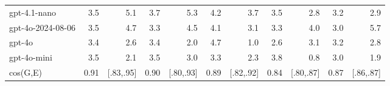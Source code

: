 \documentclass{article}
\begin{document}
\begin{table}[H]
\begin{center}
{\begin{tabular}{@{}lrrrrrrrrrr@{}}
gpt-4.1-nano &\cellcolor[HTML]{8DD3BA}\textcolor[HTML]{1A1A1A}{3.5}&\cellcolor[HTML]{3EB3C4}\textcolor[HTML]{1A1A1A}{5.1}&\cellcolor[HTML]{82CEBB}\textcolor[HTML]{1A1A1A}{3.7}&\cellcolor[HTML]{38ADC3}\textcolor[HTML]{1A1A1A}{5.3}&\cellcolor[HTML]{69C5BE}\textcolor[HTML]{1A1A1A}{4.2}&\cellcolor[HTML]{82CEBB}\textcolor[HTML]{1A1A1A}{3.7}&\cellcolor[HTML]{8DD3BA}\textcolor[HTML]{1A1A1A}{3.5}&\cellcolor[HTML]{B6E2B6}\textcolor[HTML]{1A1A1A}{2.8}&\cellcolor[HTML]{9FD9B8}\textcolor[HTML]{1A1A1A}{3.2}&\cellcolor[HTML]{B0E0B6}\textcolor[HTML]{1A1A1A}{2.9} \\
gpt-4o-2024-08-06 &\cellcolor[HTML]{8DD3BA}\textcolor[HTML]{1A1A1A}{3.5}&\cellcolor[HTML]{50BCC2}\textcolor[HTML]{1A1A1A}{4.7}&\cellcolor[HTML]{99D7B8}\textcolor[HTML]{1A1A1A}{3.3}&\cellcolor[HTML]{5ABFC0}\textcolor[HTML]{1A1A1A}{4.5}&\cellcolor[HTML]{6EC7BE}\textcolor[HTML]{1A1A1A}{4.1}&\cellcolor[HTML]{A4DCB7}\textcolor[HTML]{1A1A1A}{3.1}&\cellcolor[HTML]{99D7B8}\textcolor[HTML]{1A1A1A}{3.3}&\cellcolor[HTML]{73C8BD}\textcolor[HTML]{1A1A1A}{4.0}&\cellcolor[HTML]{AADEB7}\textcolor[HTML]{1A1A1A}{3.0}&\cellcolor[HTML]{2DA1C2}\textcolor[HTML]{EEF3F8}{5.7} \\
gpt-4o &\cellcolor[HTML]{93D5B9}\textcolor[HTML]{1A1A1A}{3.4}&\cellcolor[HTML]{C1E7B5}\textcolor[HTML]{1A1A1A}{2.6}&\cellcolor[HTML]{93D5B9}\textcolor[HTML]{1A1A1A}{3.4}&\cellcolor[HTML]{D6EFB3}\textcolor[HTML]{1A1A1A}{2.0}&\cellcolor[HTML]{50BCC2}\textcolor[HTML]{1A1A1A}{4.7}&\cellcolor[HTML]{F1F9B9}\textcolor[HTML]{1A1A1A}{1.0}&\cellcolor[HTML]{C1E7B5}\textcolor[HTML]{1A1A1A}{2.6}&\cellcolor[HTML]{A4DCB7}\textcolor[HTML]{1A1A1A}{3.1}&\cellcolor[HTML]{9FD9B8}\textcolor[HTML]{1A1A1A}{3.2}&\cellcolor[HTML]{B6E2B6}\textcolor[HTML]{1A1A1A}{2.8} \\
gpt-4o-mini &\cellcolor[HTML]{8DD3BA}\textcolor[HTML]{1A1A1A}{3.5}&\cellcolor[HTML]{D3EEB3}\textcolor[HTML]{1A1A1A}{2.1}&\cellcolor[HTML]{8DD3BA}\textcolor[HTML]{1A1A1A}{3.5}&\cellcolor[HTML]{AADEB7}\textcolor[HTML]{1A1A1A}{3.0}&\cellcolor[HTML]{99D7B8}\textcolor[HTML]{1A1A1A}{3.3}&\cellcolor[HTML]{CDEBB4}\textcolor[HTML]{1A1A1A}{2.3}&\cellcolor[HTML]{7DCCBB}\textcolor[HTML]{1A1A1A}{3.8}&\cellcolor[HTML]{F3FBBF}\textcolor[HTML]{1A1A1A}{0.8}&\cellcolor[HTML]{AADEB7}\textcolor[HTML]{1A1A1A}{3.0}&\cellcolor[HTML]{D9F0B3}\textcolor[HTML]{1A1A1A}{1.9} \\
cos(G,E) &\cellcolor[HTML]{F2FABC}\textcolor[HTML]{1A1A1A}{0.91}& {[}.83,.95{]} &\cellcolor[HTML]{F2FABC}\textcolor[HTML]{1A1A1A}{0.90}& {[}.80,.93{]} &\cellcolor[HTML]{F2FABD}\textcolor[HTML]{1A1A1A}{0.89}& {[}.82,.92{]} &\cellcolor[HTML]{F3FABE}\textcolor[HTML]{1A1A1A}{0.84}& {[}.80,.87{]} &\cellcolor[HTML]{F2FABD}\textcolor[HTML]{1A1A1A}{0.87}& {[}.86,.87{]}  \\
\bottomrule
\end{tabular}}
\end{center}
\end{table}
\end{document}
